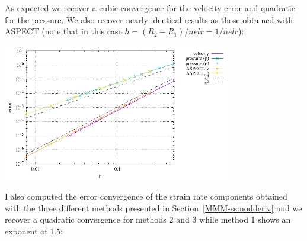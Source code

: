 As expected we recover a cubic convergence for the velocity error and quadratic for the 
pressure. We also recover nearly identical results as those obtained with ASPECT (note that 
in this case $h=(R_2-R_1)/nelr=1/nelr$): 

\begin{center}
\includegraphics[width=10cm]{python_codes/fieldstone_21/results/errors.pdf}
\end{center}

I also computed the error convergence of the strain rate components obtained with 
the three different methods presented in Section~\ref{MMM-ss:nodderiv}
and we recover a quadratic convergence for methods 2 and 3 while method 1 
shows an exponent of 1.5:


